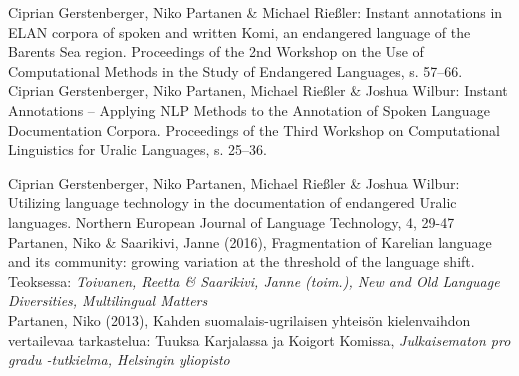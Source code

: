 \documentclass[11pt, a4paper]{article}
\newcommand{\years}[1]{\marginnote{\scriptsize #1}} %
\begin{document}

\years{2017} Ciprian Gerstenberger, Niko Partanen \& Michael Rießler: Instant annotations in ELAN corpora of spoken and written Komi, an endangered language of the Barents Sea region. Proceedings of the 2nd Workshop on the Use of Computational Methods in the Study of Endangered Languages, s. 57--66. \\

\years{2017} Ciprian Gerstenberger, Niko Partanen, Michael Rießler \& Joshua Wilbur: Instant Annotations -- Applying NLP Methods to the Annotation of Spoken Language Documentation Corpora. Proceedings of the Third Workshop on Computational Linguistics for Uralic Languages, s. 25--36.\\

\pagebreak

\years{2016} Ciprian Gerstenberger, Niko Partanen, Michael Rießler \& Joshua Wilbur: Utilizing language technology in the documentation of endangered Uralic languages. Northern European Journal of Language Technology, 4, 29-47 \\

\years{2016} Partanen, Niko \& Saarikivi, Janne (2016), Fragmentation of Karelian language and its community: growing variation at the threshold of the language shift. Teoksessa: \emph{Toivanen, Reetta \& Saarikivi, Janne (toim.), New and Old Language Diversities, Multilingual Matters}\\


\years{2013}Partanen, Niko (2013), Kahden suomalais-ugrilaisen yhteisön kielenvaihdon vertailevaa tarkastelua: Tuuksa Karjalassa ja Koigort Komissa, \emph{Julkaisematon pro gradu -tutkielma, Helsingin yliopisto}\\
\end{document}
